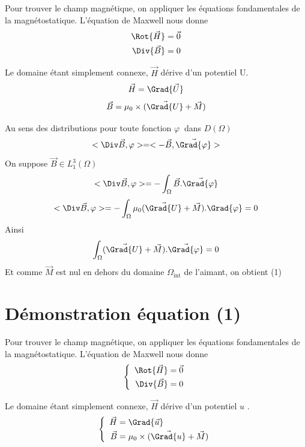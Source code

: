 \documentclass[a4paper,12pt,titlepage]{report}
\begin{document}
\begin{onehalfspace}
\begin{appendix}
Pour trouver le champ magnétique, on appliquer les équations fondamentales de la magnétostatique. L'équation de Maxwell nous donne 
\[
\begin{aligned}
\Rot{\vec{H}} &= \vec {0} \\
\Div{\vec{B}} &= 0
\end{aligned}
\]

Le domaine étant simplement connexe, $\vec{H}$ dérive d'un potentiel U.
\[\vec{H}= \Grad{\vec{U}}\]
\[\vec{B} = \mu_{0}\times(\vec{\Grad{U}}+\vec{M})\]

Au sens des distributions pour toute fonction $\varphi\ $ dans $D(\Omega)$
\[<\Div\vec{B},\varphi> =  <-\vec{B},\vec{\Grad{\varphi}}>\]
On suppose $\vec{B} \in L^{3}_{1}(\Omega)$
\[<\Div\vec{B},\varphi> =  -\int_{\Omega}\vec{B}. \vec{\Grad{\varphi}}\]
\[<\Div\vec{B},\varphi> =  -\int_{\Omega}\mu_{0}(\vec{\Grad{U}}+\vec{M}) .{\Grad{\varphi}} = 0\]
Ainsi
\[\int_{\Omega}(\vec{\Grad{U}}+\vec{M}) . \vec{\Grad{\varphi}} = 0\]
Et comme $\vec{M}$ est nul en dehors du domaine $\Omega_{\text{int}}$ de l'aimant, on obtient (1)
\fi



\iffalse
\chapter{Démonstration équation (1)}
\label{Démonstration 2}	
	Pour trouver le champ magnétique, on appliquer les équations fondamentales de la magnétostatique. L'équation de Maxwell nous donne 
	\[
		\left\{
		\begin{array}{ccc}
			\begin{aligned}
				\Rot{\vec{H}} &= \vec {0} \\
				\Div{\vec{B}} &= 0
			\end{aligned}
		\end{array}
		\right.
	\]

	Le domaine étant simplement connexe, $\vec{H}$ dérive d'un potentiel $u$	.
	\[
		\left\{
		\begin{array}{ccc}		
		\begin{aligned}
			\vec{H} &= \Grad{\vec{u}} \\
			\vec{B} &= \mu_{0}\times(\vec{\Grad{u}}+\vec{M})
		\end{aligned}
		\end{array}
		\right.
	\]


\end{appendix}
\end{onehalfspace}
\end{document}
